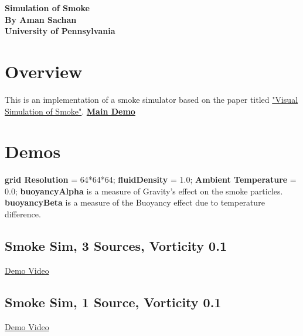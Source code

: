 \documentclass[11pt,letterpaper]{article}
\begin{document}
\pagestyle{plain}

\begin{center}
\textbf{\LARGE{Simulation of Smoke}}\\
	\textbf{\large{By Aman Sachan}}\\
	\textbf{\large{University of Pennsylvania}}\\
\end{center}


\section{Overview} 

This is an implementation of a smoke simulator based on the paper titled \href{http://physbam.stanford.edu/~fedkiw/papers/stanford2001-01.pdf}{"Visual Simulation of Smoke"}.
\newline
\textbf{ \href{https://vimeo.com/268137702}{Main Demo} }


\section{Demos}
\textbf{grid Resolution} = 64*64*64; \newline
\textbf{fluidDensity} = 1.0; \newline
\textbf{Ambient Temperature} = 0.0; \newline
\textbf{buoyancyAlpha} is a measure of Gravity's effect on the smoke particles. \newline
\textbf{buoyancyBeta} is a measure of the Buoyancy effect due to temperature difference.

\subsection{Smoke Sim, 3 Sources, Vorticity 0.1}

\href{https://vimeo.com/268137848}{Demo Video}

\subsection{Smoke Sim, 1 Source, Vorticity 0.1}

\href{https://vimeo.com/268137975}{Demo Video}
\end{document}
